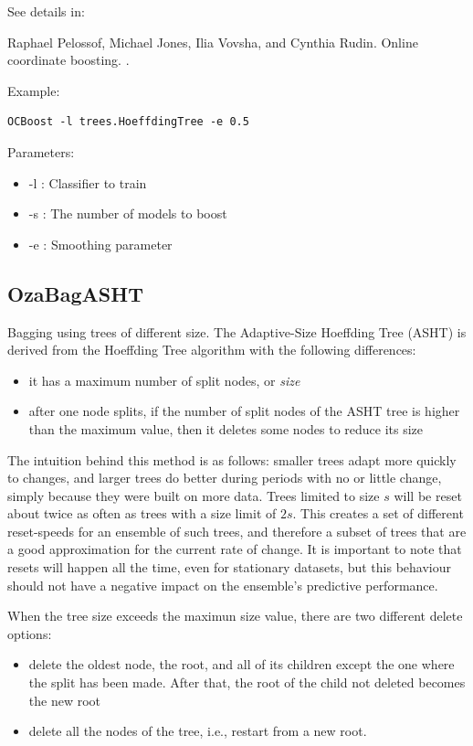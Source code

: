 \documentclass[a4paper,12pt,twoside]{book}
\begin{document}
See details in:

\begin{itemize}
Raphael Pelossof, Michael Jones, Ilia Vovsha, and Cynthia Rudin.
\newblock Online coordinate boosting.
.\end{itemize}

Example:
\begin{footnotesize}\begin{verbatim}
OCBoost -l trees.HoeffdingTree -e 0.5
\end{verbatim}\end{footnotesize}

Parameters:
\begin{itemize}
\item -l : Classifier to train
\item -s : The number of models to boost
\item -e : Smoothing parameter
\end{itemize}

\subsection{OzaBagASHT} Bagging using trees of different size.
The Adaptive-Size Hoeffding Tree (ASHT) is derived
from the Hoeffding Tree algorithm with the following differences:

\begin{itemize}
\item it has a maximum number of split nodes, or {\em size}
\item after one node splits, if the number of split nodes of the ASHT tree is higher than the
maximum value, then it deletes some nodes to reduce its size
\end{itemize}

The intuition behind this method is as follows: smaller trees adapt more quickly to changes,
and larger trees do better during periods with no or little change,
simply because they were built on more data.
Trees limited to size $s$ will be reset about twice as often as
trees with a size limit of $2s$.
This creates a set of different reset-speeds for an ensemble of such trees, and
therefore a subset of trees that are a good approximation for the current rate of change. 
It is important to note that resets will happen all the time, even for stationary datasets,
but this behaviour should not have a negative impact on the ensemble's predictive performance.

When the tree size exceeds
the maximun size value, there are two different delete options:
\begin{itemize}
 \item delete the oldest node, the root, and all of its children
except the one where the split has
been made. After that, the root of the
child not deleted becomes the new root

 \item delete all the nodes of the tree, i.e., restart from a new root.
\end{itemize}
\end{document}
